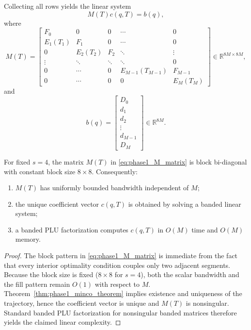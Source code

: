 Collecting all rows yields the linear system
\begin{equation}
  \label{eq:phase1_Mcb}
  M(T)c(q,T)=b(q),
\end{equation}
where
\begin{equation}
  \label{eq:phase1_M_matrix}
  M(T)
  =
  \begin{bmatrix}
    F_0        & 0          & 0          & \cdots & 0 \\
    E_1(T_1)   & F_1        & 0          & \cdots & 0 \\
    0          & E_2(T_2)   & F_2        & \ddots & \vdots \\
    \vdots     & \ddots     & \ddots     & \ddots & 0 \\
    0          & \cdots     & 0          & E_{M-1}(T_{M-1}) & F_{M-1} \\
    0          & \cdots     & 0          & 0      & E_M(T_M)
  \end{bmatrix}
  \in\mathbb R^{8M\times 8M},
\end{equation}
and
\begin{equation}
  \label{eq:phase1_b_vector}
  b(q)
  =
  \begin{bmatrix}
    D_0\\
    d_1\\
    d_2\\
    \vdots\\
    d_{M-1}\\
    D_M
  \end{bmatrix}
  \in\mathbb R^{8M}.
\end{equation}

\begin{proposition}
  \label{prop:phase1_banded}
  For fixed $s=4$, the matrix $M(T)$ in \eqref{eq:phase1_M_matrix} is block bi-diagonal with
  constant block size $8\times 8$. Consequently:
  \begin{enumerate}
    \item $M(T)$ has uniformly bounded bandwidth independent of $M$;
    \item the unique coefficient vector $c(q,T)$ is obtained by solving a banded linear system;
    \item a banded PLU factorization computes $c(q,T)$ in $O(M)$ time and $O(M)$ memory.
  \end{enumerate}
\end{proposition}

\begin{proof}
  The block pattern in \eqref{eq:phase1_M_matrix} is immediate from the fact that every interior
  optimality condition couples only two adjacent segments. Because the block size is fixed
  ($8\times 8$ for $s=4$), both the scalar bandwidth and the fill pattern remain $O(1)$ with respect
  to $M$. Theorem~\ref{thm:phase1_minco_theorem} implies existence and uniqueness of the
  trajectory, hence the coefficient vector is unique and $M(T)$ is nonsingular. Standard banded
  PLU factorization for nonsingular banded matrices therefore yields the claimed linear
  complexity.
\end{proof}

